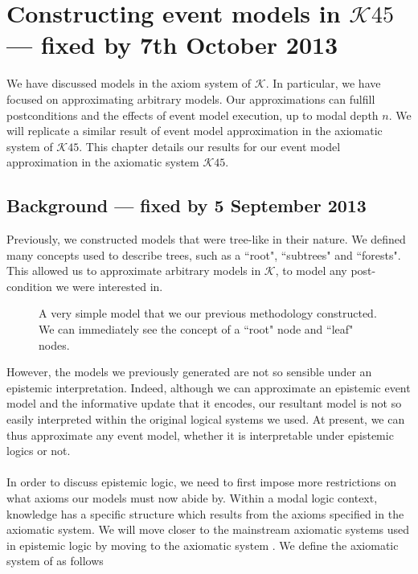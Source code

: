 \section{Constructing event models in $\mathcal{K}45$ --- fixed by 7th October 2013}

We have discussed models in the axiom system of $\mathcal{K}$.
In particular, we have focused on approximating arbitrary models.
Our approximations can fulfill postconditions and the effects of event model execution, up to modal
depth $n$.
We will replicate a similar result of event model approximation in the axiomatic system
of $\mathcal{K}45$.
This chapter details our results for our event model approximation in the axiomatic system
$\mathcal{K}45$.

\subsection{Background --- fixed by 5 September 2013}

Previously, we constructed models that were tree-like in their nature.
We defined many concepts used to describe trees, such as a ``root", ``subtrees" and ``forests".
This allowed us to approximate arbitrary models in $\mathcal{K}$, to model any post-condition we
were interested in.

\begin{figure}[ht!]
\centering
{}
\caption{A very simple model that we our previous methodology constructed.
We can immediately see the concept of a ``root" node and ``leaf" nodes.}
\label{exampleModel}
\end{figure}

However, the models we previously generated are not so sensible under an epistemic interpretation.
Indeed, although we can approximate an epistemic event model and the informative update that it
encodes, our resultant model is not so easily interpreted within the original logical systems we
used.
At present, we can thus approximate any event model, whether it is interpretable under epistemic
logics or not.\\
\\
In order to discuss epistemic logic, we need to first impose more restrictions on what axioms our
models must now abide by.
Within a modal logic context, knowledge has a specific structure which results from the axioms
specified in the axiomatic system.
We will move closer to the mainstream axiomatic systems used in epistemic logic by moving to the
axiomatic system .
We define the axiomatic system of  as follows

